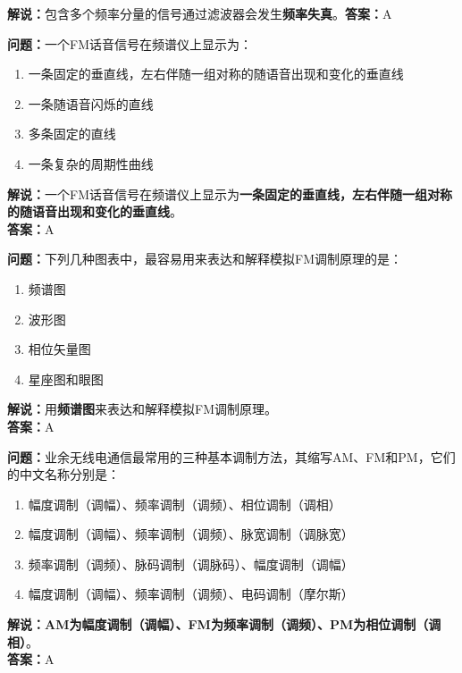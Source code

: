 \textbf{解说：}包含多个频率分量的信号通过滤波器会发生\textbf{频率失真}。\textbf{答案：}A%



\textbf{问题：}一个FM话音信号在频谱仪上显示为：

\begin{enumerate}[label=\Alph*), leftmargin=1.5cm]
	\item 一条固定的垂直线，左右伴随一组对称的随语音出现和变化的垂直线
	\item 一条随语音闪烁的直线
	\item 多条固定的直线
	\item 一条复杂的周期性曲线
\end{enumerate}

\textbf{解说：}一个FM话音信号在频谱仪上显示为\textbf{一条固定的垂直线，左右伴随一组对称的随语音出现和变化的垂直线}。\\\textbf{答案：}A%



\textbf{问题：}下列几种图表中，最容易用来表达和解释模拟FM调制原理的是：

\begin{enumerate}[label=\Alph*), leftmargin=1.5cm]
	\item 频谱图
	\item 波形图
	\item 相位矢量图
	\item 星座图和眼图
\end{enumerate}

\textbf{解说：}用\textbf{频谱图}来表达和解释模拟FM调制原理。\\\textbf{答案：}A%



\textbf{问题：}业余无线电通信最常用的三种基本调制方法，其缩写AM、FM和PM，它们的中文名称分别是：

\begin{enumerate}[label=\Alph*), leftmargin=1.5cm]
	\item 幅度调制（调幅）、频率调制（调频）、相位调制（调相）
	\item 幅度调制（调幅）、频率调制（调频）、脉宽调制（调脉宽）
	\item 频率调制（调频）、脉码调制（调脉码）、幅度调制（调幅）
	\item 幅度调制（调幅）、频率调制（调频）、电码调制（摩尔斯）
\end{enumerate}

\textbf{解说：}\textbf{AM为幅度调制（调幅）、FM为频率调制（调频）、PM为相位调制（调相）}。\\\textbf{答案：}A%



